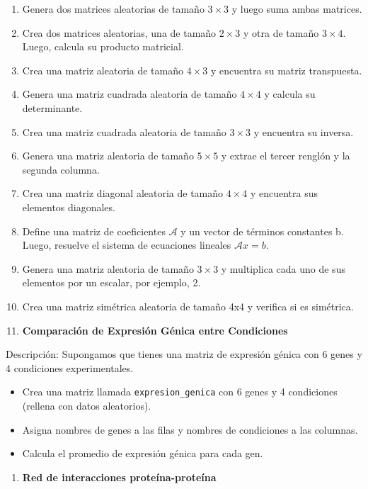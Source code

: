 \documentclass[
]{book}
\providecommand{\tightlist}{%
  \setlength{\itemsep}{0pt}\setlength{\parskip}{0pt}}
\begin{document}
\begin{enumerate}
\def\labelenumi{\arabic{enumi}.}
\item
  Genera dos matrices aleatorias de tamaño \(3 \times 3\) y luego suma ambas matrices.
\item
  Crea dos matrices aleatorias, una de tamaño \(2\times 3\) y otra de tamaño \(3 \times 4\). Luego, calcula su producto matricial.
\item
  Crea una matriz aleatoria de tamaño \(4\times 3\) y encuentra su matriz transpuesta.
\item
  Genera una matriz cuadrada aleatoria de tamaño \(4\times 4\) y calcula su determinante.
\item
  Crea una matriz cuadrada aleatoria de tamaño \(3\times 3\) y encuentra su inversa.
\item
  Genera una matriz aleatoria de tamaño \(5 \times 5\) y extrae el tercer renglón y la segunda columna.
\item
  Crea una matriz diagonal aleatoria de tamaño \(4 \times 4\) y encuentra sus elementos diagonales.
\item
  Define una matriz de coeficientes \(\mathcal A\) y un vector de términos constantes b. Luego, resuelve el sistema de ecuaciones lineales \(\mathcal Ax = b\).
\item
  Genera una matriz aleatoria de tamaño \(3\times 3\) y multiplica cada uno de sus elementos por un escalar, por ejemplo, 2.
\item
  Crea una matriz simétrica aleatoria de tamaño 4x4 y verifica si es simétrica.
\item
  \textbf{Comparación de Expresión Génica entre Condiciones}
\end{enumerate}

Descripción: Supongamos que tienes una matriz de expresión génica con 6 genes y 4 condiciones experimentales.

\begin{itemize}
\tightlist
\item
  Crea una matriz llamada \texttt{expresion\_genica} con 6 genes y 4 condiciones (rellena con datos aleatorios).
\item
  Asigna nombres de genes a las filas y nombres de condiciones a las columnas.
\item
  Calcula el promedio de expresión génica para cada gen.
\end{itemize}

\begin{enumerate}
\def\labelenumi{\arabic{enumi}.}
\setcounter{enumi}{11}
\tightlist
\item
  \textbf{Red de interacciones proteína-proteína}
\end{enumerate}
\end{document}
